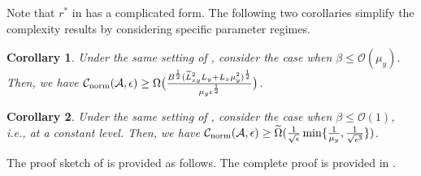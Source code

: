 \documentclass{osudissert96}
\newtheorem{corollary}{Corollary}
\begin{document}
Note that $r^*$ in  has a complicated form. 
The following two corollaries simplify the complexity results by considering specific parameter regimes. 
\begin{corollary}\label{co:co1}
Under the same setting of , consider the case when $\beta\leq \mathcal{O}(\mu_y)$. Then, we have 
$\mathcal{C}_{\text{\normalfont norm}}(\mathcal{A},\epsilon)\geq \Omega \big(\frac{B^{\frac{1}{2}}(\widetilde L^2_{xy}L_y+L_x\mu_y^2)^{\frac{1}{2}}}{\mu_y\epsilon^{\frac{1}{2}}} \big)$. 
\end{corollary}
\begin{corollary}\label{co:co2}
Under the same setting of , consider the case when $\beta \leq\mathcal{O}(1)$, i.e., at a constant level. Then, we have {\small $\mathcal{C}_{\text{\normalfont norm}}(\mathcal{A},\epsilon)\geq \widetilde \Omega(\frac{1}{\sqrt{\epsilon}}\min\{\frac{1}{\mu_y},\frac{1}{\sqrt{\epsilon^{3}}}\})$}.
\end{corollary}
The proof sketch of  is provided as follows. The complete proof is provided in . 

\end{document}
